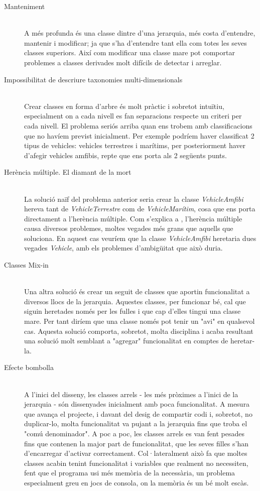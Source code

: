 \begin{description}
  \item[Manteniment] \hfill \\
    A més profunda és una classe dintre d'una jerarquia, més costa d'entendre, mantenir i modificar; ja que s'ha d'entendre tant ella com totes les seves classes superiors. Així com modificar una classe mare pot comportar problemes  a classes derivades molt difícils de detectar i arreglar.
    
  \item[Impossibilitat de descriure taxonomies multi-dimensionals] \hfill \\
    Crear classes en forma d'arbre és molt pràctic i sobretot intuïtiu, especialment on a cada nivell es fan separacions respecte un criteri per cada nivell. El problema seriós arriba quan ens trobem amb classificacions que no havíem previst inicialment. Per exemple podríem haver classificat 2 tipus de vehicles: vehicles terrestres i marítims, per posteriorment haver d'afegir vehicles amfibis, repte que ens porta als 2 següents punts.
    
  \item[Herència múltiple. El diamant de la mort] \hfill \\
    La solució naïf del problema anterior seria crear la classe {\em VehicleAmfibi} hereva tant de {\em VehicleTerrestre} com de {\em VehicleMarítim}, cosa que ens porta directament a l'herència múltiple. Com s'explica a \cite[p.~2]{Martin97}, l'herència múltiple causa diversos problemes, moltes vegades més grans que aquells que soluciona. En aquest cas veuríem que la classe {\em VehicleAmfibi} heretaria dues vegades {\em Vehicle}, amb els problemes d'ambigüitat que això duria.
    
  \item[Classes Mix-in] \hfill \\
    Una altra solució és crear un seguit de classes que aportin funcionalitat a diversos llocs de la jerarquia. Aquestes classes, per funcionar bé, cal que siguin heretades només per les fulles i que cap d'elles tingui una classe mare. Per tant diríem que una classe només pot tenir un "avi" en qualsevol cas. Aquesta solució comporta, sobretot, molta disciplina i acaba resultant una solució molt semblant a "agregar" funcionalitat en comptes de heretar-la.
    
  \item[Efecte bombolla] \hfill \\
    A l'inici del disseny, les classes arrels - les més pròximes a l'inici de la jerarquia - són dissenyades inicialment amb poca funcionalitat. A mesura que avança el projecte, i davant del desig de compartir codi i, sobretot, no duplicar-lo, molta funcionalitat va pujant a la jerarquia fins que troba el "comú denominador". A poc a poc, les classes arrels es van fent pesades fins que contenen la major part de funcionalitat, que les seves filles s'han d'encarregar d'activar correctament. Col·lateralment això fa que moltes classes acabin tenint funcionalitat i variables que realment no necessiten, fent que el programa usi més memòria de la necessària, un problema especialment greu en jocs de consola, on la memòria és un bé molt escàs.
    

\end{description}
